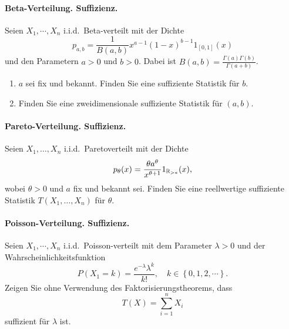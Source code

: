 \paragraph{Beta-Verteilung. Suffizienz.}
Seien $X_1, \cdots, X_n$ i.i.d.\ Beta-verteilt mit der Dichte
\begin{equation*}
    p_{a,b} = \frac{1}{B(a,b)} x^{a-1} (1-x)^{b-1} 1_{[0,1]}(x)
\end{equation*}
und den Parametern $a>0$ und $b>0$. Dabei ist $B(a,b)=
\frac{\Gamma(a)\Gamma(b)}{\Gamma(a+b)}$.
\begin{enumerate}
    \item $a$ sei fix und bekannt.  Finden Sie eine suffiziente Statistik für
        $b$.
    \item Finden Sie eine zweidimensionale suffiziente Statistik für $(a,b)$.
\end{enumerate}


\paragraph{Pareto-Verteilung. Suffizienz.}
Seien $X_1,\ldots,X_n$ i.i.d.\ Paretoverteilt mit der Dichte
\begin{equation*}
    p_\theta(x)= \frac{\theta a^\theta}{x^{\theta+1}}1_{\mathbb R_{>a}}(x),
\end{equation*}
wobei $\theta>0$ und $a$ fix und bekannt sei. Finden Sie eine reellwertige
suffiziente Statistik $T(X_1,\ldots,X_n)$ für $\theta$.


\paragraph{Poisson-Verteilung. Suffizienz.}
Seien $X_1,\cdots, X_n$ i.i.d.\ Poisson-verteilt mit dem Parameter $\lambda>0$ 
und der Wahrscheinlichkeitsfunktion 
\begin{equation*}
    P(X_1=k) = \frac{e^{-\lambda}\lambda^k}{k!}, \quad k\in \left\{ 0,1,2,\cdots \right\}.
\end{equation*}
Zeigen Sie ohne Verwendung des Faktorisierungstheorems, dass 
\begin{equation*}
    T(X) = \sum_{i=1}^{n} X_i
\end{equation*}
suffizient für $\lambda$ ist. 



